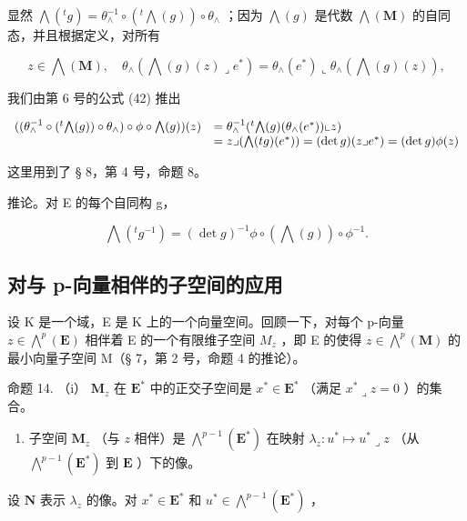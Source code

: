 显然 \(\bigwedge(^{t}g) = \theta_{\wedge}^{-1}\circ (^{t}\bigwedge (g))\circ \theta_{\wedge}\) ；因为 \(\bigwedge (g)\) 是代数 \(\bigwedge (\mathbf{M})\) 的自同态，并且根据定义，对所有

\[
z \in \bigwedge (\mathbf {M}), \quad \theta_ {\wedge} (\bigwedge (g) (z) \lrcorner e ^ {*}) = \theta_ {\wedge} (e ^ {*}) \llcorner \theta_ {\wedge} (\bigwedge (g) (z)),
\]

我们由第 6 号的公式 (42) 推出

\[
\begin{array}{r l} ((\theta_ {\wedge} ^ {- 1} \circ (^ {t} \bigwedge (g)) \circ \theta_ {\wedge}) \circ \phi \circ \bigwedge (g)) (z) & = \theta_ {\wedge} ^ {- 1} (^ {t} \bigwedge (g) (\theta_ {\wedge} (e ^ {*})) \llcorner z) \\ & = z \lrcorner (\bigwedge (t g) (e ^ {*})) = (\det g) (z \lrcorner e ^ {*}) = (\det g) \phi (z) \end{array}
\]

这里用到了 § 8，第 4 号，命题 8。

推论。对 E 的每个自同构 g，

\[
\bigwedge(^ {t} g ^ {- 1}) = (\det g) ^ {- 1} \phi \circ (\bigwedge (g)) \circ \phi^ {- 1}.\tag{80}
\]

\subsection{对与 p-向量相伴的子空间的应用}

设 K 是一个域，E 是 K 上的一个向量空间。回顾一下，对每个 p-向量 \(z \in \bigwedge^{p}(\mathbf{E})\) 相伴着 E 的一个有限维子空间 \(M_{z}\) ，即 E 的使得 \(z \in \bigwedge^{p}(\mathbf{M})\) 的最小向量子空间 M（§ 7，第 2 号，命题 4 的推论）。

命题 14. （i） \(\mathbf{M}_z\) 在 \(\mathbf{E}^*\) 中的正交子空间是 \(x^{*}\in \mathbf{E}^{*}\) （满足 \(x^{*}\lrcorner z = 0\) ）的集合。

\begin{enumerate}
\def\labelenumi{(\roman{enumi})}
\setcounter{enumi}{1}
\tightlist
\item
  子空间 \(\mathbf{M}_z\) （与 \(z\) 相伴）是 \(\bigwedge^{p-1}(\mathbf{E}^*)\) 在映射 \(\lambda_z: u^* \mapsto u^* \lrcorner z\) （从 \(\bigwedge^{p-1}(\mathbf{E}^*)\) 到 \(\mathbf{E}\) ）下的像。
\end{enumerate}

设 \(\mathbf{N}\) 表示 \(\lambda_z\) 的像。对 \(x^* \in \mathbf{E}^*\) 和 \(u^* \in \bigwedge^{p-1}(\mathbf{E}^*)\) ，

